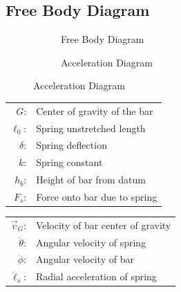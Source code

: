\documentclass[12pt]{report}
\begin{document}
\begin{flushleft}
\section{Free Body Diagram}
\begin{figure}[!htp]
  \caption{Acceleration and Free Body Diagrams}
   \begin{minipage}[c]{.5\textwidth}
     \begin{subfigure}{\textwidth}
       \caption{Free Body Diagram}
       \label{fbd}
       \center
      
      \end{subfigure}
   \end{minipage}%
   \begin{minipage}[c]{.5\textwidth}
     \begin{subfigure}{\textwidth}
       \caption{Acceleration Diagram}
       \label{ad}
       \center
       
    \end{subfigure}
   \end{minipage}
\end{figure}
\begin{minipage}[c]{.5\textwidth}
  \center
  \begin{tabular}{rl}
  $G$:&Center of gravity of the bar\\
  $\ell_0$:& Spring unstretched length \\
  $\delta$:& Spring deflection \\
  $k$:& Spring constant \\
  $h_{b}$:& Height of bar from datum \\
  $F_s$:& Force onto bar due to spring\\
\end{tabular}
\end{minipage}%
\begin{minipage}[c]{.5\textwidth}
 \center
 \begin{tabular}{rl}
 $\vec{v}_G$:& Velocity of bar center of gravity\\
 $\ddot{\theta}$:& Angular velocity of spring \\
 $\ddot{\phi}$:& Angular velocity of bar\\
 $\ddot{\ell}_s$:& Radial acceleration of spring
\end{tabular}
\end{minipage}


\end{flushleft}
\end{document}
